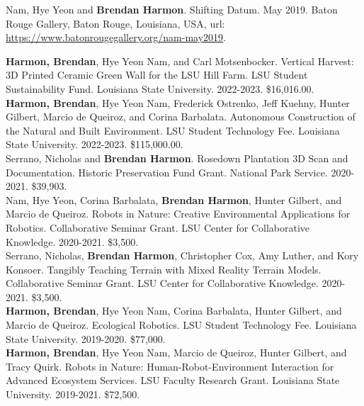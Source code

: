 \documentclass[10pt]{developercv} %
\begin{document}
Nam, Hye Yeon and \textbf{Brendan Harmon}. Shifting Datum. May 2019. Baton Rouge Gallery, Baton Rouge, Louisiana, USA, url: \url{https://www.batonrougegallery.org/nam-may2019}.\\



\textbf{Harmon, Brendan}, Hye Yeon Nam, and Carl Motsenbocker.
Vertical Harvest: 3D Printed Ceramic Green Wall for the LSU Hill Farm.
LSU Student Sustainability Fund. Louisiana State University. 
2022-2023. \$16,016.00.\\

\textbf{Harmon, Brendan}, Hye Yeon Nam, Frederick Ostrenko, Jeff Kuehny, Hunter Gilbert, Marcio de Queiroz, and Corina Barbalata. 
Autonomous Construction of the Natural and Built Environment.
LSU Student Technology Fee. Louisiana State University. 
2022-2023. \$115,000.00.\\

Serrano, Nicholas and \textbf{Brendan Harmon}. 
Rosedown Plantation 3D Scan and Documentation. 
Historic Preservation Fund Grant. National Park Service. 
2020-2021. \$39,903.\\

Nam, Hye Yeon, Corina Barbalata, \textbf{Brendan Harmon}, Hunter Gilbert, and Marcio de Queiroz.
Robots in Nature: Creative Environmental Applications for Robotics.
Collaborative Seminar Grant. LSU Center for Collaborative Knowledge.
2020-2021. \$3,500.\\

Serrano, Nicholas, \textbf{Brendan Harmon}, Christopher Cox, Amy Luther, and Kory Konsoer.
Tangibly Teaching Terrain with Mixed Reality Terrain Models.
Collaborative Seminar Grant. LSU Center for Collaborative Knowledge.
2020-2021. \$3,500.\\

\textbf{Harmon, Brendan}, Hye Yeon Nam, Corina Barbalata, Hunter Gilbert, and Marcio de Queiroz.
Ecological Robotics.
LSU Student Technology Fee. Louisiana State University. 
2019-2020.	\$77,000.\\

\textbf{Harmon, Brendan}, Hye Yeon Nam, Marcio de Queiroz, Hunter Gilbert, and Tracy Quirk. 
Robots in Nature: Human-Robot-Environment Interaction for Advanced Ecosystem Services. 
LSU Faculty Research Grant. Louisiana State University. 
2019-2021. \$72,500.\\
\end{document}
